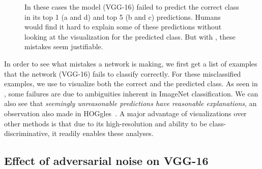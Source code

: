 \begin{figure}[ht!]
\begin{center}
\begin{subfigure}[b]{0.23\linewidth}
        \caption{}
        \label{fig:failure_snake}
    \end{subfigure}
    \vspace{14pt}
     \caption{
In these cases the model (VGG-16) failed to predict the correct class in its top 1 (a and d) and top 5 (b and c) predictions. Humans would find it hard to explain some of these predictions without looking at the visualization for the predicted class. But with  \gcam{}, these mistakes seem justifiable.
    }
    \label{fig:failures}
    \end{center}
    \vspace{-5pt}
\end{figure}

In order to see what mistakes a network is making, we first get a list of examples
that the network (VGG-16) fails to classify correctly.
For these misclassified examples, we use \cgb{} to visualize both the correct and the predicted class.
As seen in , some failures are due to ambiguities inherent
in ImageNet classification. We can also see that \emph{seemingly unreasonable
predictions have reasonable explanations}, an
observation also made in HOGgles~\cite{vondrick_iccv13}.
    A major advantage of \cgb{} visualizations over other methods is that due to
    its high-resolution and ability to be class-discriminative, it readily enables these analyses.

\vspace{-8pt}
\subsection{Effect of adversarial noise on VGG-16}\label{sec:adversarial_noise}

